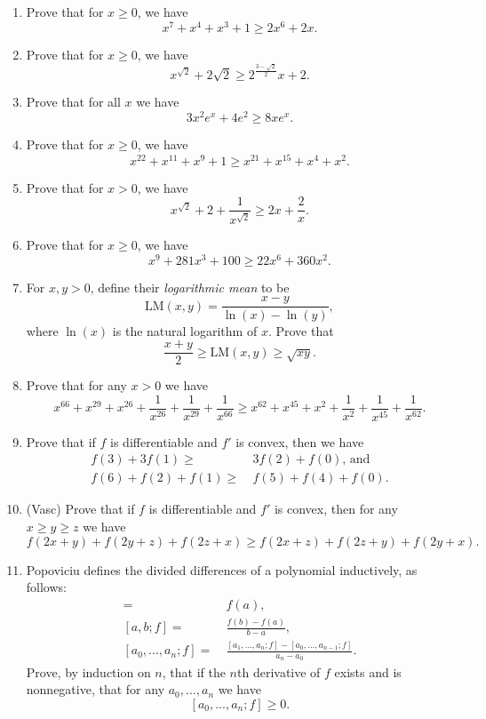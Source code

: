 \begin{enumerate}
\item Prove that for $x \ge 0$, we have \[x^7 + x^4 + x^3 + 1 \ge 2x^6 + 2x.\]

\item Prove that for $x \ge 0$, we have \[x^{\sqrt{2}} + 2\sqrt{2} \ge 2^{\frac{3 - \sqrt{2}}{2}}x + 2.\]

\item Prove that for all $x$ we have \[3x^2e^x + 4e^2 \ge 8xe^x.\]

\item Prove that for $x \ge 0$, we have \[x^{22} + x^{11} + x^9 + 1 \ge x^{21} + x^{15} + x^4 + x^2.\]

\item Prove that for $x > 0$, we have \[x^{\sqrt{2}} + 2 + \frac{1}{x^{\sqrt{2}}} \ge 2x + \frac{2}{x}.\]

\item Prove that for $x \ge 0$, we have \[x^9 + 281x^3 + 100 \ge 22x^6 + 360x^2.\]

\item For $x, y > 0$, define their \emph{logarithmic mean} to be \[\text{LM}(x,y) = \frac{x-y}{\ln(x)-\ln(y)},\] where $\ln(x)$ is the natural logarithm of $x$. Prove that \[\frac{x+y}{2} \ge \text{LM}(x,y) \ge \sqrt{xy}.\]

\item Prove that for any $x > 0$ we have
\[
x^{66} + x^{29} + x^{26} + \frac{1}{x^{26}} + \frac{1}{x^{29}} + \frac{1}{x^{66}} \ge x^{62} + x^{45} + x^{2} + \frac{1}{x^{2}} + \frac{1}{x^{45}} + \frac{1}{x^{62}}.
\]

\item Prove that if $f$ is differentiable and $f'$ is convex, then we have
\begin{align*}
f(3)+3f(1) \ge&\ 3f(2) + f(0)\mbox{, and}\\
f(6)+f(2)+f(1) \ge&\ f(5) + f(4) + f(0).
\end{align*}

\item (Vasc) Prove that if $f$ is differentiable and $f'$ is convex, then for any $x\ge y\ge z$ we have
\[
f(2x+y)+f(2y+z)+f(2z+x) \ge f(2x+z) + f(2z+y) + f(2y+x).
\]

\item Popoviciu defines the divided differences of a polynomial inductively, as follows:
\begin{align*}
[a;f] =&\ f(a),\\
[a,b;f] =&\ \frac{f(b)-f(a)}{b-a},\\
[a_0,...,a_n;f] =&\ \frac{[a_1,...,a_n;f]-[a_0, ..., a_{n-1};f]}{a_n-a_0}.
\end{align*}
Prove, by induction on $n$, that if the $n$th derivative of $f$ exists and is nonnegative, that for any $a_0, ..., a_n$ we have
\[
[a_0, ..., a_n;f]\ge 0.
\]


\end{enumerate}
